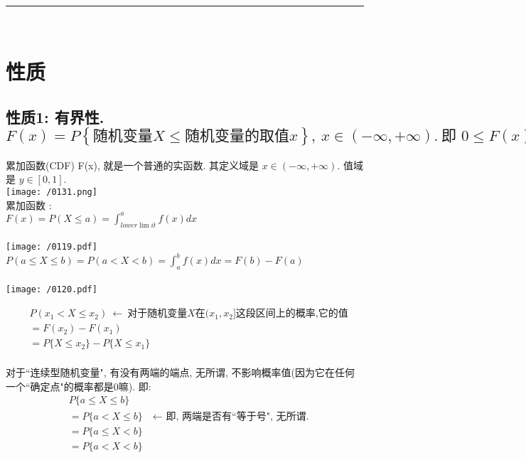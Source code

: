 \documentclass[UTF8]{ctexart}
\begin{document}
	
	~\\
	\hrule
	~\\
	
	\section{性质}
	
	
	\subsection{性质1: 有界性. $	F\left( x \right) =P\left\{ \text{随机变量}X\leq \text{随机变量的取值}x \right\} ,\ x\in \left( -\infty ,+\infty \right) .\ \text{即\ }0\leq F\left( x \right) \leq 1	$}
	
	累加函数(CDF) F(x), 就是一个普通的实函数. 其定义域是 $x \in (-\infty, +\infty)$. 值域是 $y \in [0,1]$. \\
	
	\texttt{[image: /0131.png]} \\
	
	
	
	累加函数 : \\
	$ \boxed{
		F(x)=P(X\leq a)=\int_{lower\lim it}^a{f\left( x \right) dx}	}$ \\
	\\
	\texttt{[image: /0119.pdf]} \\
	
	
	$ \boxed{
		P(a\leq X\leq b)=P(a<X<b)=\int_a^b{f\left( x \right) dx}=F\left( b \right) -F\left( a \right) 	} $ \\
	\\
	\texttt{[image: /0120.pdf]} 
	
	
	\begin{align*}  %
		& P(x_1<X\leq x_2)\ ←\ \text{对于随机变量}X\text{在}(x_1,x_2]\text{这段区间上的概率,它的值}\\
		& =F(x_2)-F(x_1)\\
		& =P\{X\leq x_2\}-P\{X\leq x_1\}
	\end{align*} \\
	
	
	对于``连续型随机变量", 有没有两端的端点, 无所谓, 不影响概率值(因为它在任何一个``确定点"的概率都是0嘛). 即: 
	\begin{align*}
		& P \{ a \leq X \leq b \} \\
		& = P \{ a < X \leq b \}  \quad  \text{← 即, 两端是否有``等于号", 无所谓.} \\
		& = P \{ a \leq X < b \}  \\
		& = P \{ a < X < b \}
	\end{align*} 
	
\end{document}
